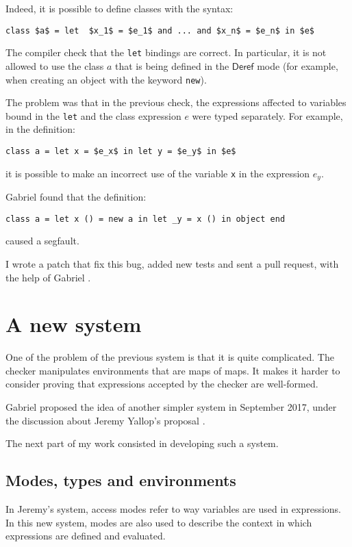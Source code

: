 \documentclass{article}
\newcommand{\Deref}{\mathsf{Deref}}
\begin{document}
Indeed, it is possible to define classes with the syntax:
\begin{lstlisting}[mathescape=true]
class $a$ = let  $x_1$ = $e_1$ and ... and $x_n$ = $e_n$ in $e$
\end{lstlisting}
The compiler check that the \lstinline|let| bindings are correct. In
particular, it is not allowed to use the class $a$ that is being defined in the
$\Deref$ mode (for example, when creating an object with the keyword
\lstinline|new|).

The problem was that in the previous check, the expressions affected to
variables bound in the \lstinline|let| and the class expression $e$ were
typed separately. For example, in the definition:
\begin{lstlisting}[mathescape=true]
class a = let x = $e_x$ in let y = $e_y$ in $e$
\end{lstlisting}
it is possible to make an incorrect use of the variable \lstinline|x| in the
expression $e_y$.

Gabriel found that the definition:
\begin{lstlisting}
class a = let x () = new a in let _y = x () in object end
\end{lstlisting}
caused a segfault.

I wrote a patch that fix this bug, added new tests and sent a pull request,
with the help of Gabriel \cite{PullRequest}.


\section{A new system}
One of the problem of the previous system is that it is quite complicated. The
checker manipulates environments that are maps of maps. It makes it harder to
consider proving that expressions accepted by the checker are well-formed.

Gabriel proposed the idea of another simpler system in September 2017, under the
discussion about Jeremy Yallop's proposal \cite{SchererRules}.

The next part of my work consisted in developing such a system.

\subsection{Modes, types and environments}
In Jeremy's system, access modes refer to way variables are used in expressions.
In this new system, modes are also used to describe the context in which
expressions are defined and evaluated.
\end{document}
